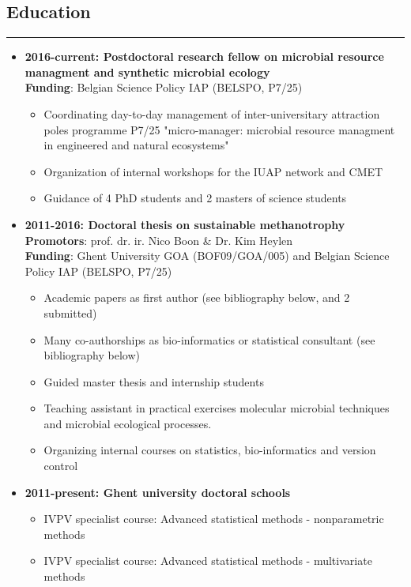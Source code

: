 \documentclass[a4paper,11pt,oneside]{article}
\begin{document}
\subsection*{Education}
\rule{\textwidth}{1pt}
\begin{itemize}
\item \textbf{2016-current: Postdoctoral research fellow on microbial resource managment and synthetic microbial ecology} \\
\textbf{Funding}: Belgian Science Policy IAP (BELSPO, P7/25)
    \begin{itemize}
      \item Coordinating day-to-day management of inter-universitary attraction poles programme P7/25 "micro-manager: microbial resource managment in engineered and natural ecosystems"
      \item Organization of internal workshops for the IUAP network and CMET
      \item Guidance of 4 PhD students and 2 masters of science students
    \end{itemize}
\item \textbf{2011-2016: Doctoral thesis on sustainable methanotrophy}\\
\textbf{Promotors}: prof. dr. ir. Nico Boon \& Dr. Kim Heylen \\
\textbf{Funding}: Ghent University GOA (BOF09/GOA/005) and Belgian Science Policy IAP (BELSPO, P7/25)
    \begin{itemize}
      \item Academic papers as first author (see bibliography below, \cite{kerckhof2014optimized} and 2 submitted)
      \item Many co-authorships as bio-informatics or statistical consultant  (see bibliography below)
      \item Guided master thesis and internship students
      \item Teaching assistant in practical exercises molecular microbial techniques and microbial ecological processes.
      \item Organizing internal courses on statistics, bio-informatics and version control
    \end{itemize}
\item \textbf{2011-present: Ghent university doctoral schools}
    \begin{itemize}
      \item IVPV specialist course: Advanced statistical methods - nonparametric methods
      \item IVPV specialist course: Advanced statistical methods - multivariate methods

\end{itemize}
\end{itemize}
\end{document}
